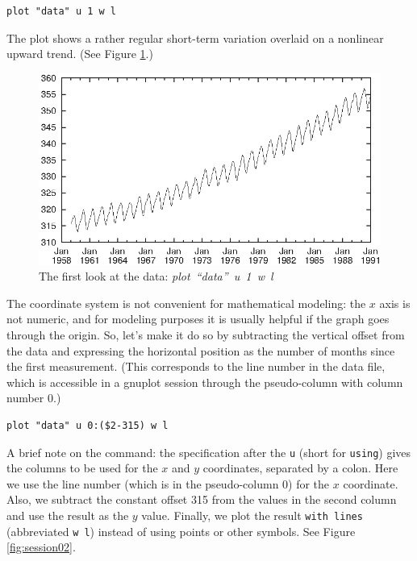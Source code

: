 \begin{verbatim}
plot "data" u 1 w l
\end{verbatim}

The plot shows a rather regular short-term variation overlaid on a
nonlinear upward trend. (See Figure \ref{fig:session01}.)

\begin{figure}[t!]
  \centerline{\includegraphics{img/session01}}
  \caption{The first look at the data: \hbox{\em plot ``data'' u 1 w l}}
  \label{fig:session01}
\end{figure}
    
The coordinate system is not convenient for mathematical modeling: the
$x$ axis is not numeric, and for modeling purposes it is usually helpful
if the graph goes through the origin. So, let's make it do so by
subtracting the vertical offset from the data and expressing the
horizontal position as the number of months since the first
measurement.  (This corresponds to the line number in the data file,
which is accessible in a gnuplot session through the pseudo-column
with column number 0.) 

\begin{verbatim}
plot "data" u 0:($2-315) w l
\end{verbatim}

A brief note on the command: the specification after the \texttt{u}
(short for \texttt{using}) gives the columns to be used for the $x$
and $y$ coordinates, separated by a colon. Here we use the line number
(which is in the pseudo-column 0) for the $x$ coordinate.  Also, we
subtract the constant offset 315 from the values in the second column
and use the result as the $y$ value. Finally, we plot the result
\texttt{with lines} (abbreviated \texttt{w l}) instead of using points
or other symbols. See Figure \ref{fig:session02}.

